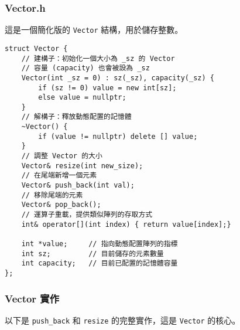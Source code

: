 \subsubsection{Vector.h}
這是一個簡化版的 \verb|Vector| 結構，用於儲存整數。
\begin{lstlisting}[caption=Vector]
struct Vector {
    // 建構子：初始化一個大小為 _sz 的 Vector
    // 容量 (capacity) 也會被設為 _sz
    Vector(int _sz = 0) : sz(_sz), capacity(_sz) {
        if (sz != 0) value = new int[sz];
        else value = nullptr;
    }
    // 解構子：釋放動態配置的記憶體
    ~Vector() {
        if (value != nullptr) delete [] value;
    }
    // 調整 Vector 的大小
    Vector& resize(int new_size);
    // 在尾端新增一個元素
    Vector& push_back(int val);
    // 移除尾端的元素
    Vector& pop_back();
    // 運算子重載，提供類似陣列的存取方式
    int& operator[](int index) { return value[index];}
    
    int *value;     // 指向動態配置陣列的指標
    int sz;         // 目前儲存的元素數量
    int capacity;   // 目前已配置的記憶體容量
};
\end{lstlisting}

\subsubsection{Vector 實作}
以下是 \verb|push_back| 和 \verb|resize| 的完整實作，這是 \verb|Vector| 的核心。

